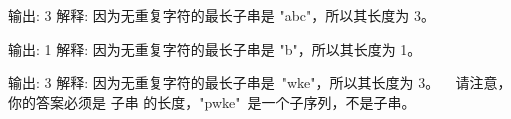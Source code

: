 输出: 3 
解释: 因为无重复字符的最长子串是 "abc"，所以其长度为 3。

输出: 1
解释: 因为无重复字符的最长子串是 "b"，所以其长度为 1。

输出: 3
解释: 因为无重复字符的最长子串是 "wke"，所以其长度为 3。
     请注意，你的答案必须是 子串 的长度，"pwke" 是一个子序列，不是子串。
